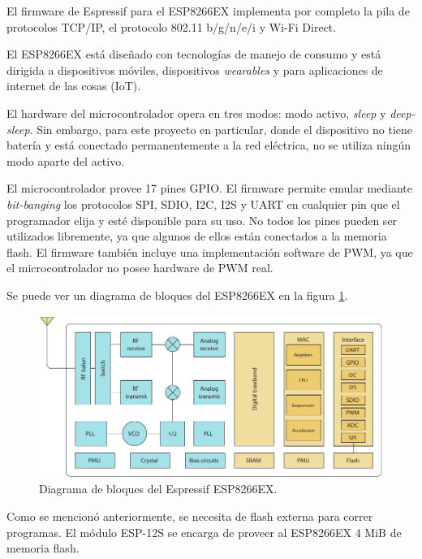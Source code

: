 El firmware de Espressif para el ESP8266EX implementa por completo la pila de protocolos TCP/IP, el protocolo 802.11 b/g/n/e/i y Wi-Fi Direct.

El ESP8266EX está diseñado con tecnologías de manejo de consumo y está dirigida a dispositivos móviles, dispositivos \emph{wearables} y para aplicaciones de internet de las cosas (IoT).

El hardware del microcontrolador opera en tres modos: modo activo, \emph{sleep} y \emph{deep-sleep}. Sin embargo, para este proyecto en particular, donde el dispositivo no tiene batería y está conectado permanentemente a la red eléctrica, no se utiliza ningún modo aparte del activo.

El microcontrolador provee 17 pines GPIO. El firmware permite emular mediante \emph{bit-banging} los protocolos SPI, SDIO, I2C, I2S y UART en cualquier pin que el programador elija y esté disponible para su uso. No todos los pines pueden ser utilizados libremente, ya que algunos de ellos están conectados a la memoria flash. El firmware también incluye una implementación software de PWM, ya que el microcontrolador no posee hardware de PWM real.

Se puede ver un diagrama de bloques del ESP8266EX en la figura \ref{fig:diagrama-bloques-esp8266ex}.

\begin{figure}[htp!]
	\centering
	\begin{center}
	\includegraphics[width=\linewidth]{imagenes/diagrama-bloques-esp8266.pdf}
	\caption{Diagrama de bloques del Espressif ESP8266EX.}
	\label{fig:diagrama-bloques-esp8266ex}
	\end{center}
\end{figure}

Como se mencionó anteriormente, se necesita de flash externa para correr programas. El módulo ESP-12S se encarga de proveer al ESP8266EX 4 MiB de memoria flash.

